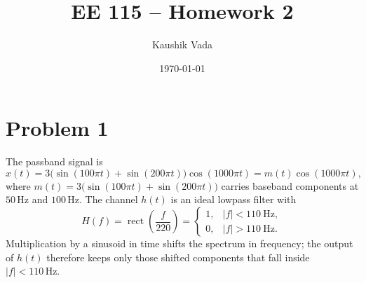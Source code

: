 \documentclass[12pt]{article}
\title{EE 115 -- Homework 2}
\author{Kaushik Vada}
\date{\today}
\begin{document}
\maketitle

\section*{Problem 1}

The passband signal is
\[
  x(t) = 3\bigl(\sin(100\pi t) + \sin(200\pi t)\bigr)\cos(1000\pi t)
       = m(t)\cos(1000\pi t),
\]
where $m(t) = 3\bigl(\sin(100\pi t) + \sin(200\pi t)\bigr)$ carries baseband components at $50\,\text{Hz}$ and $100\,\text{Hz}$.  The channel $h(t)$ is an ideal lowpass filter with
\[
H(f) = \operatorname{rect}\!\left(\frac{f}{220}\right) =
  \begin{cases}
    1, & |f| < 110~\text{Hz},\\
    0, & |f| > 110~\text{Hz}.
  \end{cases}
\]
Multiplication by a sinusoid in time shifts the spectrum in frequency; the output of $h(t)$ therefore keeps only those shifted components that fall inside $|f|<110\,\text{Hz}$.
\end{document}
